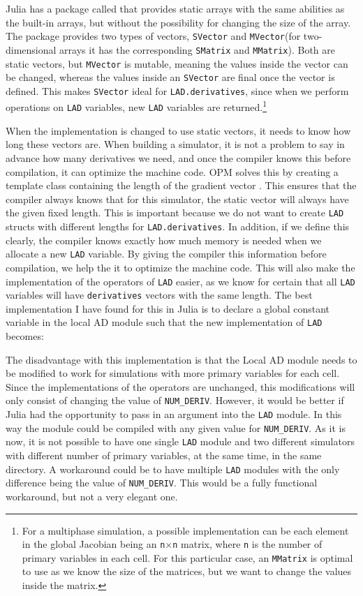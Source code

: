 Julia has a package called \emph{\cite{StaticArrays}} that provides static arrays with the same abilities as the built-in arrays, but without the possibility for changing the size of the array. The package provides two types of vectors, \texttt{SVector} and \texttt{MVector}(for two-dimensional arrays it has the corresponding \texttt{SMatrix} and \texttt{MMatrix}). Both are static vectors, but \texttt{MVector} is mutable, meaning the values inside the vector can be changed, whereas the values inside an \texttt{SVector} are final once the vector is defined. This makes \texttt{SVector} ideal for \texttt{LAD.derivatives}, since when we perform operations on \texttt{LAD} variables, new \texttt{LAD} variables are returned.\footnote{For a multiphase simulation, a possible implementation can be each element in the global Jacobian being an \texttt{n}$\times$\texttt{n} matrix, where \texttt{n} is the number of primary variables in each cell. For this particular case, an \texttt{MMatrix} is optimal to use as we know the size of the matrices, but we want to change the values inside the matrix.} 

When the implementation is changed to use static vectors, it needs to know how long these vectors are. When building a simulator, it is not a problem to say in advance how many derivatives we need, and once the compiler knows this before compilation, it can optimize the machine code. OPM solves this by creating a template class containing the length of the gradient vector \emph{\citep{lauser2018local}}. This ensures that the compiler always knows that for this simulator, the static vector will always have the given fixed length. This is important because we do not want to create \texttt{LAD} structs with different lengths for \texttt{LAD.derivatives}. In addition, if we define this clearly, the compiler knows exactly how much memory is needed when we allocate a new \texttt{LAD} variable. By giving the compiler this information before compilation, we help the it to optimize the machine code. This will also make the implementation of the operators of \texttt{LAD} easier, as we know for certain that all \texttt{LAD} variables will have \texttt{derivatives} vectors with the same length. The best implementation I have found for this in Julia is to declare a global constant variable in the local AD module such that the new implementation of \texttt{LAD} becomes:

The disadvantage with this implementation is that the Local AD module needs to be modified to work for simulations with more primary variables for each cell. Since the implementations of the operators are unchanged, this modifications will only consist of changing the value of \texttt{NUM\_DERIV}. However, it would be better if Julia had the opportunity to pass in an argument into the \texttt{LAD} module. In this way the module could be compiled with any given value for \texttt{NUM\_DERIV}. As it is now, it is not possible to have one single \texttt{LAD} module and two different simulators with different number of primary variables, at the same time, in the same directory. A workaround could be to have multiple \texttt{LAD} modules with the only difference being the value of \texttt{NUM\_DERIV}. This would be a fully functional workaround, but not a very elegant one.

